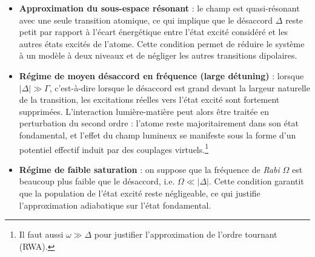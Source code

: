 \begin{itemize}[label = $\bullet$]
  \item \textbf{Approximation du sous-espace résonant} : le champ est quasi-résonant avec une seule transition atomique, ce qui implique que le désaccord $\Delta$ reste petit par rapport à l’écart énergétique entre l’état excité considéré et les autres états excités de l’atome. Cette condition permet de réduire le système à un modèle à deux niveaux et de négliger les autres transitions dipolaires.
  
  \item \textbf{Régime de moyen désaccord en fréquence (large détuning)} : lorsque $|\Delta| \gg \Gamma$, c’est-à-dire lorsque le désaccord est grand devant la largeur naturelle de la transition, les excitations réelles vers l’état excité sont fortement supprimées. L’interaction lumière-matière peut alors être traitée en perturbation du second ordre : l’atome reste majoritairement dans son état fondamental, et l’effet du champ lumineux se manifeste sous la forme d’un potentiel effectif induit par des couplages virtuels.\footnote{Il faut aussi $\omega \gg \Delta$ pour justifier l'approximation de l'ordre tournant (RWA).}
  
  \item \textbf{Régime de faible saturation} : on suppose que la fréquence de \emph{Rabi} $\Omega$ est beaucoup plus faible que le désaccord, i.e. $\Omega \ll |\Delta|$. Cette condition garantit que la population de l’état excité reste négligeable, ce qui justifie l’approximation adiabatique sur l’état fondamental.
\end{itemize}




